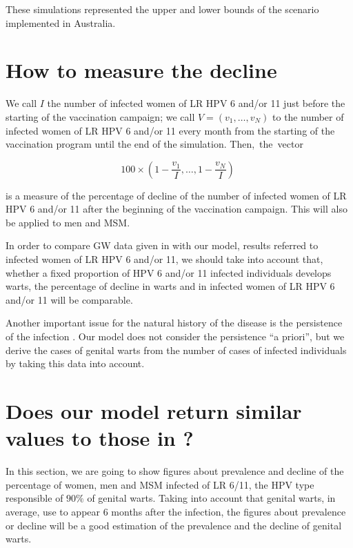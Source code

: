 These simulations represented the upper and lower bounds of the scenario implemented in Australia. 

\section{How to measure the decline}\label{sec:decline}%

We call $I$ the number of infected women of LR HPV 6 and/or 11 just before the starting of the vaccination campaign; we call $V = ( v_1, \ldots, v_N)$ to the number of infected women of LR HPV 6 and/or 11 every month from the starting of the vaccination program until the end of the simulation. Then,~the~vector 

\begin{equation}
100 \times \left( 1-\displaystyle\frac{v_1}{I}, \ldots, 1-\displaystyle\frac{v_N}{I} \right) \; 
\end{equation}

is a measure of the percentage of decline of the number of infected women of LR HPV 6 and/or 11 after the beginning of the vaccination campaign. This will also be applied to men and MSM.

In order to compare GW data given in \cite{ali2013genital} with our model, results referred to infected women of LR HPV 6 and/or 11, we should take into account that, whether a fixed proportion of HPV 6 and/or 11 infected individuals develops warts, the percentage of decline in warts and in infected women of LR HPV 6 and/or 11 will be comparable. 

Another important issue for the natural history of the disease is the persistence of the infection \cite{campos2014updated}. Our model does not consider the persistence ``a priori'', but we derive the cases of genital warts from the number of cases of infected individuals by taking this data into account.

\section{Does our model return similar values to those in \cite{ali2013genital}?}

In this section, we are going to show figures about prevalence and decline of the percentage of women, men and MSM infected of LR 6/11, the HPV type responsible of $90\%$ of genital warts. Taking into account that genital warts, in average, use to appear 6 months after the infection, the figures about prevalence or decline will be a good estimation of the prevalence and the  decline of genital warts.  

